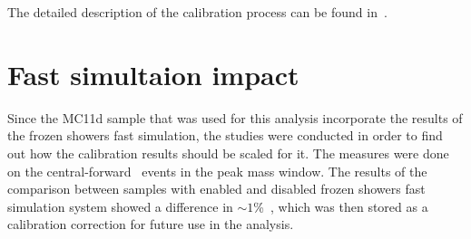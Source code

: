 The detailed description of the calibration process can be found in~\cite{lib:calib}.

\section{Fast simultaion impact}

Since the MC11d sample that was used for this analysis incorporate the results of the frozen showers fast simulation, the studies were conducted in order to find out how the calibration results should be scaled for it. The measures were done on the central-forward \Zee\ events in the peak mass window. The results of the comparison between samples with enabled and disabled frozen showers fast simulation system showed a difference in $\sim 1$\%~\cite{lib:calib_support}, which was then stored as a calibration correction for future use in the analysis.
